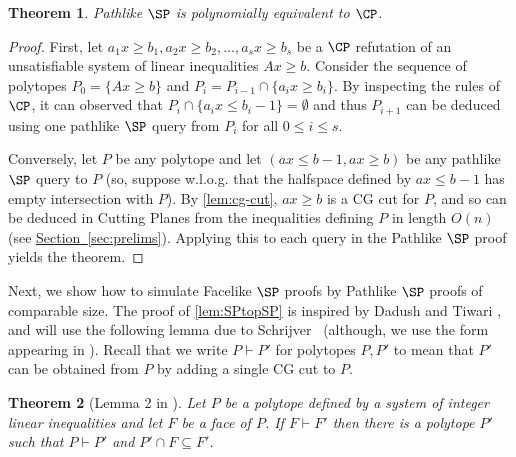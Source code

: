 \documentclass[11pt]{article}
\newcommand{\expref}[2]{\texorpdfstring{\hyperref[#2]{#1~\ref{#2}}}{#1~\ref{#2}}}
\newtheorem{theorem}{Theorem}[section]
\begin{document}
\begin{theorem}\label{lem:pathsp-cp}
	 Pathlike $\SP$ is polynomially equivalent to $\CP$. 	
\end{theorem}
\begin{proof}
	First, let $a_1x \geq b_1, a_2x \geq b_2, \ldots, a_sx \geq b_s$ be a $\CP$ refutation of an unsatisfiable system of linear inequalities $Ax \geq b$. 
	Consider the sequence of polytopes $P_0 =\{Ax \geq b\}$ and $P_i = P_{i-1} \cap \{a_i x \geq b_i\}$. 
	By inspecting the rules of $\CP$, it can observed that $P_i \cap \{a_ix \leq b_i-1\}= \emptyset$ and thus $P_{i+1}$ can be deduced using one pathlike $\SP$ query from $P_i$ for all $0 \leq i \leq s$.
	
	Conversely, let $P$ be any polytope and let $(ax \leq b-1, ax \geq b)$ be any pathlike $\SP$ query to $P$ (so, suppose w.l.o.g. that the halfspace defined by $ax \leq b-1$ has empty intersection with $P$).
	By \autoref{lem:cg-cut}, $ax \geq b$ is a CG cut for $P$, and so can be deduced in Cutting Planes from the inequalities defining $P$ in length $O(n)$
%
(see \expref{Section}{sec:prelims}).    %
	Applying this to each query in the Pathlike $\SP$ proof yields the theorem.
%
%
%
%
%
%
\end{proof}
	Next, we show how to simulate Facelike $\SP$ proofs by Pathlike $\SP$ proofs of comparable size.
	The proof of \autoref{lem:SPtopSP} is inspired by Dadush and Tiwari \cite{TseitinUpperBound}, and will use the following lemma due to Schrijver~\cite{SCHRIJVER1980291} (although, we use the form appearing in \cite{CookCT87}).
	Recall that we write $P \vdash P'$ for polytopes $P, P'$ to mean that $P'$ can be obtained from $P$ by adding a single CG cut to $P$.
	\begin{theorem}[Lemma 2 in \cite{CookCT87}]
	\label{lem:shrijver}
		Let $P$ be a polytope defined by a system of integer linear inequalities and let $F$ be a face of $P$. 
		If $F \vdash F'$ then there is a polytope $P'$ such that $P \vdash P'$ and $P' \cap F \subseteq F'$.
	\end{theorem}
	
\end{document}
